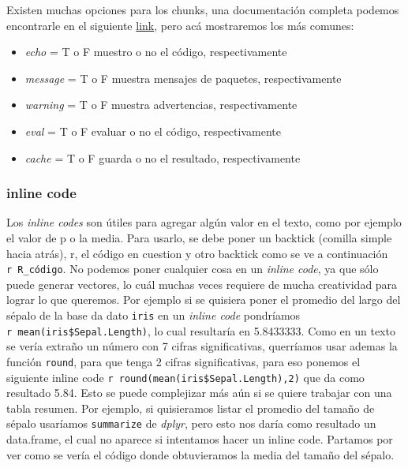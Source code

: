 \documentclass[]{book}
\providecommand{\tightlist}{%
  \setlength{\itemsep}{0pt}\setlength{\parskip}{0pt}}
\begin{document}
Existen muchas opciones para los chunks, una documentación completa
podemos encontrarle en el siguiente
\href{https://yihui.name/knitr/options/}{link}, pero acá mostraremos los
más comunes:

\begin{itemize}
\tightlist
\item
  \emph{echo} = T o F muestro o no el código, respectivamente
\item
  \emph{message} = T o F muestra mensajes de paquetes, respectivamente
\item
  \emph{warning} = T o F muestra advertencias, respectivamente
\item
  \emph{eval} = T o F evaluar o no el código, respectivamente
\item
  \emph{cache} = T o F guarda o no el resultado, respectivamente
\end{itemize}

\hypertarget{inline-code}{%
\subsubsection{inline code}\label{inline-code}}

Los \emph{inline codes} son útiles para agregar algún valor en el texto,
como por ejemplo el valor de p o la media. Para usarlo, se debe poner un
backtick (comilla simple hacia atrás), r, el código en cuestion y otro
backtick como se ve a continuación
\texttt{\textasciigrave{}r\ R\_código\textasciigrave{}}. No podemos
poner cualquier cosa en un \emph{inline code}, ya que sólo puede generar
vectores, lo cuál muchas veces requiere de mucha creatividad para lograr
lo que queremos. Por ejemplo si se quisiera poner el promedio del largo
del sépalo de la base da dato \texttt{iris} en un \emph{inline code}
pondríamos
\texttt{\textasciigrave{}r\ mean(iris\$Sepal.Length)\textasciigrave{}},
lo cual resultaría en 5.8433333. Como en un texto se vería extraño un
número con 7 cifras significativas, querríamos usar ademas la función
\texttt{round}, para que tenga 2 cifras significativas, para eso ponemos
el siguiente inline code
\texttt{\textasciigrave{}r\ round(mean(iris\$Sepal.Length),2)\textasciigrave{}}
que da como resultado 5.84. Esto se puede complejizar más aún si se
quiere trabajar con una tabla resumen. Por ejemplo, si quisieramos
listar el promedio del tamaño de sépalo usaríamos \texttt{summarize} de
\emph{dplyr}, pero esto nos daría como resultado un data.frame, el cual
no aparece si intentamos hacer un inline code. Partamos por ver como se
vería el código donde obtuvieramos la media del tamaño del sépalo.
\end{document}
